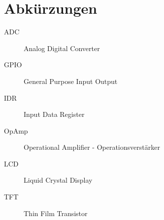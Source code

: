\documentclass[a4paper,11pt,titlepage]{article}
\begin{document}


\tableofcontents
\thispagestyle{empty}
\clearpage

\setcounter{page}{3}
\section*{Abkürzungen}
\begin{description}
	\item[ADC]
	Analog Digital Converter
	
	\item[GPIO]
	General Purpose Input Output

	\item[IDR]
	Input Data Register
	
	\item[OpAmp]
	Operational Amplifier - Operationsverstärker

	\item[LCD]
	Liquid Crystal Display

	\item[TFT]
	Thin Film Transistor
\end{description}
\clearpage

\setcounter{page}{1}

















\end{document}
